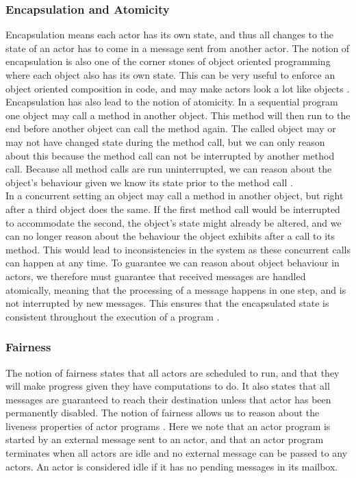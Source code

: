 \subsubsection{Encapsulation and Atomicity}
Encapsulation means each actor has its own state, and thus all changes to the state of an actor has to come in a message sent from another actor. The notion of encapsulation is also one of the corner stones of object oriented programming where each object also has its own state. This can be very useful to enforce an object oriented composition in code, and may make actors look a lot like objects \cite{ActorModelPaper}.\\
Encapsulation has also lead to the notion of atomicity. In a sequential program one object may call a method in another object. This method will then run to the end before another object can call the method again. The called object may or may not have changed state during the method call, but we can only reason about this because the method call can not be interrupted by another method call. Because all method calls are run uninterrupted, we can reason about the object's behaviour given we know its state prior to the method call \cite{ActorModelPaper}.\\
In a concurrent setting an object may call a method in another object, but right after a third object does the same. If the first method call would be interrupted to accommodate the second, the object's state might already be altered, and we can no longer reason about the behaviour the object exhibits after a call to its method. This would lead to inconsistencies in the system as these concurrent calls can happen at any time. To guarantee we can reason about object behaviour in actors, we therefore must guarantee that received messages are handled atomically, meaning that the processing of a message happens in one step, and is not interrupted by new messages. This ensures that the encapsulated state is consistent throughout the execution of a program \cite{ActorModelPaper}.

\subsubsection{Fairness}
The notion of fairness states that all actors are scheduled to run, and that they will make progress given they have computations to do. It also states that all messages are guaranteed to reach their destination unless that actor has been permanently disabled. The notion of fairness allows us to reason about the liveness properties of actor programs \cite{ActorModelPaper}. Here we note that an actor program is started by an external message sent to an actor, and that an actor program terminates when all actors are idle and no external message can be passed to any actors. An actor is considered idle if it has no pending messages in its mailbox.

